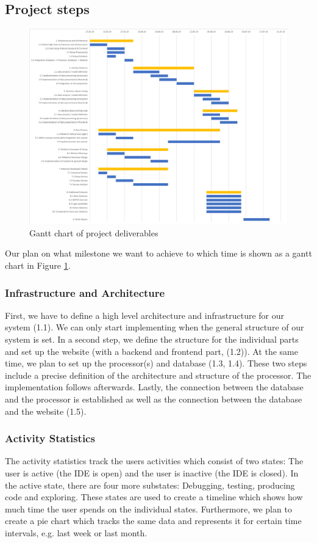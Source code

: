 \documentclass{seal_article}
\begin{document}
\subsection{Project steps}
\begin{figure}
  \includegraphics[width=\linewidth]{images/project_structure.png}
  \caption{Gantt chart of project deliverables}
  \label{fig:gantt}
\end{figure}

Our plan on what milestone we want to achieve to which time is shown as a gantt chart in Figure \ref{fig:gantt}.

\subsubsection{Infrastructure and Architecture}
First, we have to define a high level architecture and infrastructure for our system (1.1). We can only start implementing when the general structure of our system is set. In a second step, we define the structure for the individual parts and set up the website (with a backend and frontend part, (1.2)). At the same time, we plan to set up the processor(s) and database (1.3, 1.4). These two steps include a precise definition of the architecture and structure of the processor. The implementation follows afterwards. Lastly, the connection between the database and the processor is established as well as the connection between the database and the website (1.5).

\subsubsection{Activity Statistics}
The activity statistics track the users activities which consist of two states: The user is active (the IDE is open) and the user is inactive (the IDE is closed). In the active state, there are four more substates: Debugging, testing, producing code and exploring. These states are used to create a timeline which shows how much time the user spends on the individual states. Furthermore, we plan to create a pie chart which tracks the same data and represents it for certain time intervals, e.g. last week or last month.
\end{document}
